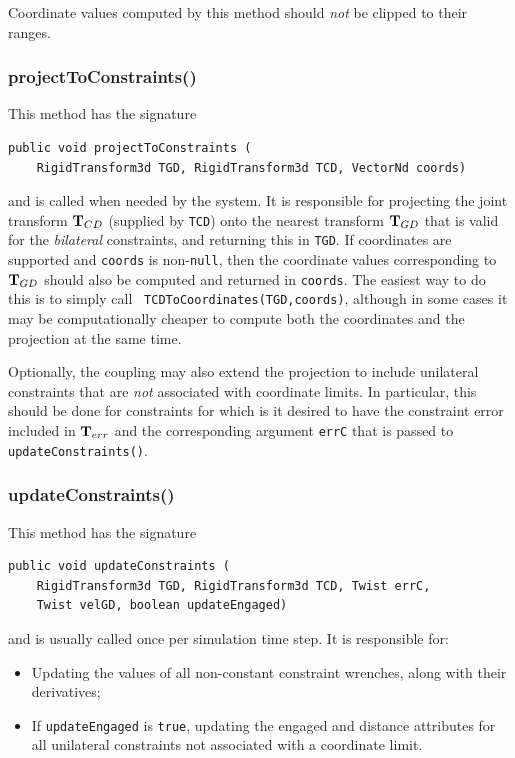 \begin{sideblock}
Coordinate values computed by this method should {\it not} be clipped
to their ranges.
\end{sideblock}

\subsubsection*{projectToConstraints()}

This method has the signature
\begin{lstlisting}[]
  public void projectToConstraints (
    RigidTransform3d TGD, RigidTransform3d TCD, VectorNd coords)
\end{lstlisting}
%
and is called when needed by the system. It is responsible for
projecting the joint transform ${\bf T}_{CD}$ (supplied by {\tt TCD}) onto
the nearest transform ${\bf T}_{GD}$ that is valid for the {\it bilateral}
constraints, and returning this in {\tt TGD}.  If coordinates are
supported and {\tt coords} is non-{\tt null}, then the coordinate
values corresponding to ${\bf T}_{GD}$ should also be computed and returned
in {\tt coords}. The easiest way to do this is to simply call {\tt
TCDToCoordinates(TGD,coords)}, although in some cases it may be
computationally cheaper to compute both the coordinates and the
projection at the same time.

Optionally, the coupling may also extend the projection to include
unilateral constraints that are {\it not} associated with coordinate
limits. In particular, this should be done for constraints for which
is it desired to have the constraint error included in ${\bf T}_{err}$ and
the corresponding argument {\tt errC} that is passed to {\tt
updateConstraints()}.

\subsubsection*{updateConstraints()}

This method has the signature
%
\begin{lstlisting}[]
  public void updateConstraints (
    RigidTransform3d TGD, RigidTransform3d TCD, Twist errC,
    Twist velGD, boolean updateEngaged)
\end{lstlisting}
%
and is usually called once per simulation time step. It is responsible
for:

\begin{itemize}

\item Updating the values of all non-constant constraint wrenches,
along with their derivatives;

\item If {\tt updateEngaged} is {\tt true}, updating the {\sf engaged}
and {\sf distance} attributes for all unilateral constraints not
associated with a coordinate limit.

\end{itemize}

